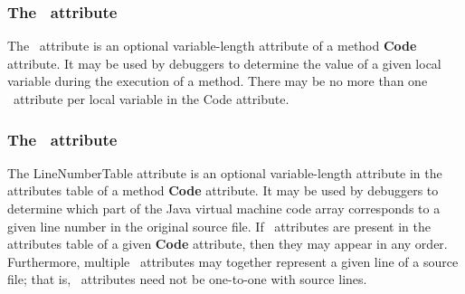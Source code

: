 \subsubsection{The \localVariableTable \ attribute } \label{locVarTab}
The \localVariableTable \  attribute is an optional variable-length attribute of a method \textbf{Code}  attribute. 
It may be used by debuggers to determine the value of a given local variable during the execution of a method.
 There may be no more than one \localVariableTable \ attribute per local variable in the Code attribute.


\subsubsection{The \lineNumberTable \ attribute}\label{lineNumTab}

The LineNumberTable attribute is an optional variable-length attribute in the attributes table of a method \textbf{Code} attribute. 
It may be used by debuggers to determine which part of the Java virtual machine code array corresponds to a given line number in the original source file.
 If \lineNumberTable \ attributes are present in the attributes table of a given \textbf{Code} attribute, then they may appear in any order.
 Furthermore, multiple \lineNumberTable \ attributes may together represent a given line of a source file;
 that is, \lineNumberTable \  attributes need not be one-to-one with source lines.


